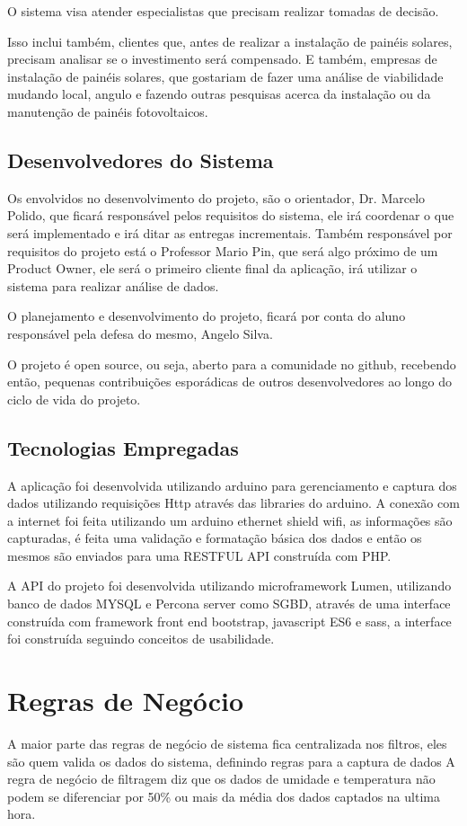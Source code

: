 O sistema visa atender especialistas que precisam realizar tomadas de decisão.

Isso inclui também, clientes que, antes de realizar a instalação de painéis solares, precisam analisar se o investimento será compensado. E também, empresas de instalação de painéis solares, que gostariam de fazer uma análise de viabilidade mudando local, angulo e fazendo outras pesquisas acerca da instalação ou da manutenção de painéis fotovoltaicos.

\subsection{Desenvolvedores do Sistema}

Os envolvidos no desenvolvimento do projeto, são o orientador, Dr. Marcelo Polido, que ficará responsável pelos requisitos do sistema, ele irá coordenar o que será implementado e irá ditar as entregas incrementais. Também responsável por requisitos do projeto está o Professor Mario Pin, que será algo próximo de um Product Owner, ele será o primeiro cliente final da aplicação, irá utilizar o sistema para realizar análise de dados.

O planejamento e desenvolvimento do projeto, ficará por conta do aluno responsável pela defesa do mesmo, Angelo Silva.

O projeto é open source, ou seja, aberto para a comunidade no github, recebendo então, pequenas contribuições esporádicas de outros desenvolvedores ao longo do ciclo de vida do projeto.

\subsection{Tecnologias Empregadas}

A aplicação foi desenvolvida utilizando arduino para gerenciamento e captura dos dados utilizando requisições Http através das libraries do arduino. A conexão com a internet foi feita utilizando um arduino ethernet shield wifi, as informações são capturadas, é feita uma validação e formatação básica dos dados e então os mesmos são enviados para uma RESTFUL API construída com PHP.

A API do projeto foi desenvolvida utilizando microframework Lumen, utilizando banco de dados MYSQL e Percona server como SGBD, através de uma interface construída com framework front end bootstrap, javascript ES6 e sass, a interface foi construída seguindo conceitos de usabilidade.

\section{Regras de Negócio}

A maior parte das regras de negócio de sistema fica centralizada nos filtros, eles são quem valida os dados do sistema, definindo regras para a captura de dados
A regra de negócio de filtragem diz que os dados de umidade e temperatura não podem se diferenciar por 50\% ou mais da média dos dados captados na ultima hora.

